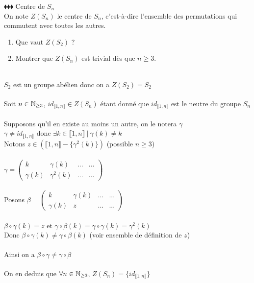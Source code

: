 \documentclass[11pt]{article}
\begin{document}
\begin{exercise}{$\blacklozenge\blacklozenge\blacklozenge$}{}
    Centre de $S_{n}$\\
    On note $Z(S_{n})$ le centre de $S_{n}$, c'est-à-dire l'ensemble des permutations qui commutent avec toutes les autres.\\
    \begin{enumerate}
        \item Que vaut $Z(S_{2})$ ?
        \item Montrer que $Z(S_{n})$ est trivial dès que $n \geq 3$.
    \end{enumerate}
    \tcblower\\[0.2cm]
     $S_{2}$ est un groupe abélien donc on a $Z(S_{2}) = S_{2}$\\\\
     Soit $n \in \mathbb{N}_{\geq 3}$, $id_{\llbracket 1, n \rrbracket} \in Z(S_{n})$ étant donné que $id_{\llbracket 1, n \rrbracket}$ est le neutre du groupe $S_{n}$\\\\
    Supposons qu'il en existe au moins un autre, on le notera $\gamma$\\
    $\gamma \neq id_{\llbracket 1, n \rrbracket}$ donc $\exists k \in \llbracket 1, n \rrbracket ~|~ \gamma(k) \neq k$\\
    Notons $z \in (\llbracket 1, n \rrbracket - \{\gamma^{2}(k)\})$ (possible $n \geq 3$) \\\\
    $\gamma = \begin{pmatrix}
        k & \gamma(k) & ... & ... \\
        \gamma(k) & \gamma^{2}(k) & ... & ...
    \end{pmatrix}$\\\\
    Posons $\beta = \begin{pmatrix}
        k & \gamma(k) & ... & ... \\
        \gamma(k) & z & ... & ...
    \end{pmatrix}$\\\\
    $\beta \circ \gamma(k) = z$ et $\gamma \circ \beta(k) = \gamma \circ \gamma(k) = \gamma^{2}(k)$\\
    Donc $\beta \circ \gamma(k) \neq \gamma \circ \beta(k)$ (voir ensemble de définition de $z$)\\\\
    Ainsi on a $\beta \circ \gamma \neq \gamma \circ \beta$\\\\
    On en deduis que $\forall n \in \mathbb{N}_{\geq 3}$, $Z(S_{n}) = \{ id_{\llbracket 1, n \rrbracket} \}$
\end{exercise}
\end{document}
